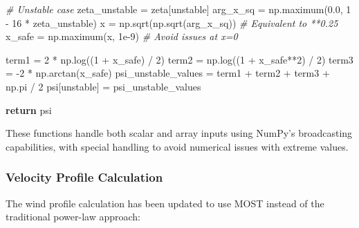 \documentclass[
]{article}
\newenvironment{Shaded}{}{}
\newcommand{\CommentTok}[1]{\textcolor[rgb]{0.38,0.63,0.69}{\textit{#1}}}
\newcommand{\ControlFlowTok}[1]{\textcolor[rgb]{0.00,0.44,0.13}{\textbf{#1}}}
\newcommand{\DecValTok}[1]{\textcolor[rgb]{0.25,0.63,0.44}{#1}}
\newcommand{\FloatTok}[1]{\textcolor[rgb]{0.25,0.63,0.44}{#1}}
\newcommand{\NormalTok}[1]{#1}
\newcommand{\OperatorTok}[1]{\textcolor[rgb]{0.40,0.40,0.40}{#1}}
\begin{document}
\begin{Shaded}
\begin{Highlighting}[]
    \CommentTok{\# Unstable case}
\NormalTok{    zeta\_unstable }\OperatorTok{=}\NormalTok{ zeta[unstable]}
\NormalTok{    arg\_x\_sq }\OperatorTok{=}\NormalTok{ np.maximum(}\FloatTok{0.0}\NormalTok{, }\DecValTok{1} \OperatorTok{{-}} \DecValTok{16} \OperatorTok{*}\NormalTok{ zeta\_unstable)}
\NormalTok{    x }\OperatorTok{=}\NormalTok{ np.sqrt(np.sqrt(arg\_x\_sq))  }\CommentTok{\# Equivalent to **0.25}
\NormalTok{    x\_safe }\OperatorTok{=}\NormalTok{ np.maximum(x, }\FloatTok{1e{-}9}\NormalTok{)    }\CommentTok{\# Avoid issues at x=0}
    
\NormalTok{    term1 }\OperatorTok{=} \DecValTok{2} \OperatorTok{*}\NormalTok{ np.log((}\DecValTok{1} \OperatorTok{+}\NormalTok{ x\_safe) }\OperatorTok{/} \DecValTok{2}\NormalTok{)}
\NormalTok{    term2 }\OperatorTok{=}\NormalTok{ np.log((}\DecValTok{1} \OperatorTok{+}\NormalTok{ x\_safe}\OperatorTok{**}\DecValTok{2}\NormalTok{) }\OperatorTok{/} \DecValTok{2}\NormalTok{)}
\NormalTok{    term3 }\OperatorTok{=} \OperatorTok{{-}}\DecValTok{2} \OperatorTok{*}\NormalTok{ np.arctan(x\_safe)}
\NormalTok{    psi\_unstable\_values }\OperatorTok{=}\NormalTok{ term1 }\OperatorTok{+}\NormalTok{ term2 }\OperatorTok{+}\NormalTok{ term3 }\OperatorTok{+}\NormalTok{ np.pi }\OperatorTok{/} \DecValTok{2}
\NormalTok{    psi[unstable] }\OperatorTok{=}\NormalTok{ psi\_unstable\_values}

    \ControlFlowTok{return}\NormalTok{ psi}
\end{Highlighting}
\end{Shaded}

These functions handle both scalar and array inputs using NumPy's
broadcasting capabilities, with special handling to avoid numerical
issues with extreme values.

\hypertarget{velocity-profile-calculation}{%
\subsubsection{Velocity Profile
Calculation}\label{velocity-profile-calculation}}

The wind profile calculation has been updated to use MOST instead of the
traditional power-law approach:
\end{document}
